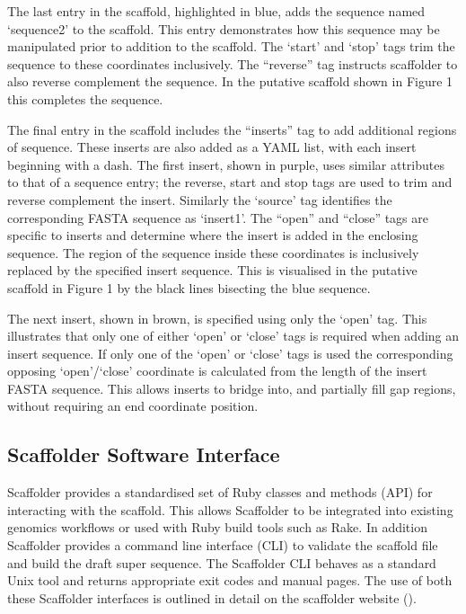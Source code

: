 \documentclass[10pt]{bmc_article}
\newenvironment{bmcformat}{\begin{raggedright}\baselineskip20pt\sloppy\setboolean{publ}{false}}{\end{raggedright}\baselineskip20pt\sloppy}
\begin{document}
\begin{bmcformat}
The last entry in the scaffold, highlighted in blue, adds the sequence named
`sequence2' to the scaffold. This entry demonstrates how this sequence may be
manipulated prior to addition to the scaffold. The `start' and `stop' tags
trim the sequence to these coordinates inclusively. The
``reverse'' tag instructs scaffolder to also reverse complement the sequence.
In the putative scaffold shown in Figure 1 this completes the  sequence. \pb

The final entry in the scaffold  includes the ``inserts'' tag to
add additional regions of sequence. These inserts are also added as a YAML
list, with each insert beginning with a dash. The first insert, shown in
purple, uses similar attributes to that of a sequence entry; the reverse,
start and stop tags are used to trim and reverse complement the insert.
Similarly the `source' tag identifies the corresponding FASTA sequence as
`insert1'. The ``open'' and ``close'' tags are specific to inserts and
determine where the insert is added in the enclosing sequence. The region of
the sequence inside these coordinates is inclusively replaced by the specified
insert sequence. This is visualised in the putative scaffold in Figure 1 by
the black lines bisecting the blue sequence. \pb

The next insert, shown in brown, is specified using only the `open' tag. This
illustrates that only one of either `open' or `close' tags is required when
adding an insert sequence. If only one of the `open' or `close' tags is used
the corresponding opposing `open'/`close' coordinate is calculated from the
length of the insert FASTA sequence. This allows inserts to bridge into, and
partially fill gap regions, without requiring an end coordinate position. \pb

\subsection*{Scaffolder Software Interface} %

Scaffolder provides a standardised set of Ruby classes and methods (API) for
interacting with the scaffold. This allows Scaffolder to be integrated into
existing genomics workflows or used with Ruby build tools such as Rake. In
addition Scaffolder provides a command line interface (CLI) to validate the
scaffold file and build the draft super sequence. The Scaffolder CLI behaves
as a standard Unix tool and returns appropriate exit codes and manual pages.
The use of both these Scaffolder interfaces is outlined in detail on the
scaffolder website (\scaffolder).  \pb


\end{bmcformat}
\end{document}
